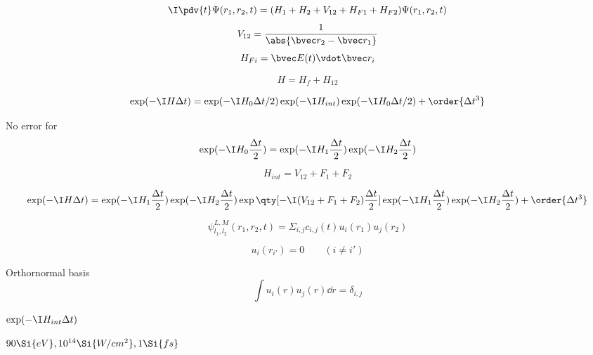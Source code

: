 
\begin{equation}
\I \pdv{t}\Psi(r_1, r_2, t) = (H_1 + H_2 + V_{12} + H_{F1} + H_{F2})\Psi(r_1, r_2, t)
\end{equation}
\begin{equation}
V_{12} = \frac{1}{\abs{\bvec r_2 - \bvec r_1}}
\end{equation}
\begin{equation}
H_{Fi} = \bvec E(t) \vdot \bvec r_i
\end{equation}

\begin{equation}
H = H_f + H_{12}
\end{equation}

\begin{equation}
\exp(-\I H \Delta t) = \exp(-\I H_0 \Delta t/2) \exp(-\I H_{int}) \exp(-\I H_0 \Delta t/2) + \order{\Delta t^3}
\end{equation}

No error for
\begin{equation}
\exp(-\I H_0 \frac{\Delta t}{2}) = \exp(-\I H_{1} \frac{\Delta t}{2}) \exp(-\I H_2 \frac{\Delta t}{2})
\end{equation}

\begin{equation}
H_{int} = V_{12} + F_1 + F_2
\end{equation}

\begin{equation}
\exp(-\I H\Delta t) = \exp(-\I H_{1} \frac{\Delta t}{2}) \exp(-\I H_2 \frac{\Delta t}{2}) \exp\qty[-\I (V_{12} + F_1 + F_2) \frac{\Delta t}{2}] \exp(-\I H_{1} \frac{\Delta t}{2}) \exp(-\I H_{2} \frac{\Delta t}{2}) + \order{\Delta t^3}
\end{equation}

\begin{equation}
\psi_{l_1,l_2}^{L,M}(r_1, r_2, t) = \Sigma_{i,j} c_{i,j}(t) u_i(r_1) u_j(r_2)
\end{equation}

\begin{equation}
u_i(r_{i'}) = 0 \qquad (i \ne i')
\end{equation}

Orthornormal basis
\begin{equation}
\int u_i(r)u_j(r) \dd{r} = \delta_{i,j}
\end{equation}

$\exp(-\I H_{int}\Delta t)$

$90\Si{eV}, 10^{14} \Si{W/cm^2}, 1\Si{fs}$

